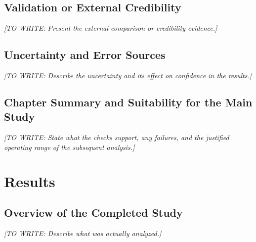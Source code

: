\documentclass[12pt,a4paper,oneside]{report}
\newif\ifshowguidance
\newcommand{\Guide}[1]{%
  \ifshowguidance
  \begin{tcolorbox}[enhanced,breakable,colback=GuideBlue,
    colframe=GuideBorder,boxrule=0.5pt,arc=1mm,
    title={Writing guide --- replace with your research},
    colbacktitle=ThesisBlue,coltitle=white,fonttitle=\small\bfseries,
    before skip=10pt,after skip=10pt]
    \small #1
  \end{tcolorbox}
  \fi}
\newcommand{\Draft}[1]{\par\noindent\textit{[TO WRITE: #1]}\par}
\begin{document}
\section{Validation or External Credibility}
\Guide{Compare with independent measurements, trusted references,
out-of-sample observations, established benchmarks, or other appropriate
evidence. Do not use the same evidence both to tune a model and to claim
independent validation without explaining the dependence. For qualitative
work, describe contextually suitable credibility practices.}
\Draft{Present the external comparison or credibility evidence.}

\section{Uncertainty and Error Sources}
\Guide{Distinguish measurement, sampling, numerical, parameter, and model
uncertainty as relevant. Explain estimation and propagation methods and
the uncertainty not captured by your analysis. Separate random variation
from systematic bias where evidence allows.}
\Draft{Describe the uncertainty and its effect on confidence in the results.}

\section{Chapter Summary and Suitability for the Main Study}
\Draft{State what the checks support, any failures, and the justified
operating range of the subsequent analysis.}

\chapter{Results}
\label{ch:results}
\Guide{Present the evidence in the order needed to answer the questions.
Clearly separate main findings, secondary analyses, and exploratory findings.
Describe observations here; develop the broader explanation in Chapter~7,
unless a combined results-and-discussion structure suits your discipline.
Report negative and inconclusive results when relevant.}

\section{Overview of the Completed Study}
\Guide{Report the actual analyzed sample, cases, successful/failed runs,
exclusions, and deviations from the planned procedure. Summarize relevant
data or case characteristics without repeating the full methodology.}
\Draft{Describe what was actually analyzed.}
\end{document}
